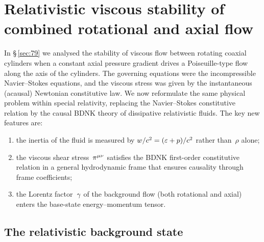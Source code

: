 %
%

\section{Relativistic viscous stability of combined rotational
and axial flow}\label{sec:rel-80}

In \S\,\ref{sec:79} we analysed the stability of viscous flow between
rotating coaxial cylinders when a constant axial pressure gradient
drives a Poiseuille-type flow along the axis of the cylinders.  The
governing equations were the incompressible Navier--Stokes equations, and
the viscous stress was given by the instantaneous (acausal)
Newtonian constitutive law.  We now reformulate the same physical
problem within special relativity, replacing the Navier--Stokes
constitutive relation by the causal BDNK theory of
dissipative relativistic fluids.  The key new features are:
\begin{enumerate}
\item[(i)] the inertia of the fluid is measured by
  $w/c^{2}=(\varepsilon+p)/c^{2}$ rather than~$\rho$ alone;
\item[(ii)] the viscous shear stress~$\pi^{\mu\nu}$ satisfies the BDNK first-order
  constitutive relation in a general hydrodynamic frame that ensures
  causality through frame coefficients;
\item[(iii)] the Lorentz factor~$\gamma$ of the background flow
  (both rotational and axial) enters the base-state
  energy--momentum tensor.
\end{enumerate}

\subsection{The relativistic background state}\label{sec:rel-80-bg}

